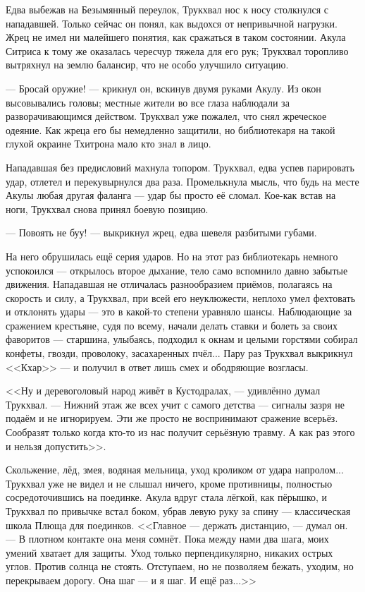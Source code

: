 Едва выбежав на Безымянный переулок, Трукхвал нос к носу столкнулся с нападавшей.
Только сейчас он понял, как выдохся от непривычной нагрузки.
Жрец не имел ни малейшего понятия, как сражаться в таком состоянии.
Акула Ситриса к тому же оказалась чересчур тяжела для его рук;
Трукхвал торопливо вытряхнул на землю балансир, что не особо улучшило ситуацию.

--- Бросай оружие! --- крикнул он, вскинув двумя руками Акулу.
Из окон высовывались головы;
местные жители во все глаза наблюдали за разворачивающимся действом.
Трукхвал уже пожалел, что снял жреческое одеяние.
Как жреца его бы немедленно защитили, но библиотекаря на такой глухой окраине Тхитрона мало кто знал в лицо.

Нападавшая без предисловий махнула топором.
Трукхвал, едва успев парировать удар, отлетел и перекувырнулся два раза.
Промелькнула мысль, что будь на месте Акулы любая другая фаланга --- удар бы просто её сломал.
Кое-как встав на ноги, Трукхвал снова принял боевую позицию.

--- Повоять не буу! --- выкрикнул жрец, едва шевеля разбитыми губами.

На него обрушилась ещё серия ударов.
Но на этот раз библиотекарь немного успокоился --- открылось второе дыхание, тело само вспомнило давно забытые движения.
Нападавшая не отличалась разнообразием приёмов, полагаясь на скорость и силу, а Трукхвал, при всей его неуклюжести, неплохо умел фехтовать и отклонять удары --- это в какой-то степени уравняло шансы.
Наблюдающие за сражением крестьяне, судя по всему, начали делать ставки и болеть за своих фаворитов --- старшина, улыбаясь, подходил к окнам и целыми горстями собирал конфеты, гвозди, проволоку, засахаренных пчёл...
Пару раз Трукхвал выкрикнул <<Кхар>> --- и получил в ответ лишь смех и ободряющие возгласы.

<<Ну и деревоголовый народ живёт в Кустодралах, --- удивлённо думал Трукхвал.
--- Нижний этаж же всех учит с самого детства --- сигналы зазря не подаём и не игнорируем.
Эти же просто не воспринимают сражение всерьёз.
Сообразят только когда кто-то из нас получит серьёзную травму.
А как раз этого и нельзя допустить>>.

Скольжение, лёд, змея, водяная мельница, уход кроликом от удара напролом...
Трукхвал уже не видел и не слышал ничего, кроме противницы, полностью сосредоточившись на поединке.
Акула вдруг стала лёгкой, как пёрышко, и Трукхвал по привычке встал боком, убрав левую руку за спину --- классическая школа Плюща для поединков.
<<Главное --- держать дистанцию, --- думал он.
--- В плотном контакте она меня сомнёт.
Пока между нами два шага, моих умений хватает для защиты.
Уход только перпендикулярно, никаких острых углов.
Против солнца не стоять.
Отступаем, но не позволяем бежать, уходим, но перекрываем дорогу.
Она шаг --- и я шаг.
И ещё раз...>>

